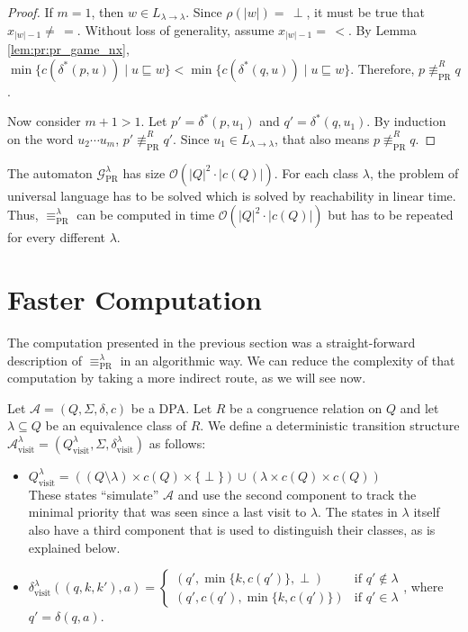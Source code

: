 \begin{proof}
	If $m = 1$, then $w \in L_{\lambda \rightarrow \lambda}$. Since $\rho(|w|) =\, \perp$, it must be true that $x_{|w|-1} \neq\, =$. Without loss of generality, assume $x_{|w|-1} =\, <$. By Lemma \ref{lem:pr:pr_game_nx}, $\min \{ c(\delta^*(p, u)) \mid u \sqsubseteq w \} < \min \{ c(\delta^*(q, u)) \mid u \sqsubseteq w \}$. Therefore, $p \not\equiv_\text{PR}^R q$.
	
	Now consider $m+1 > 1$. Let $p' = \delta^*(p, u_1)$ and $q' = \delta^*(q, u_1)$. By induction on the word $u_2 \cdots u_m$, $p' \not\equiv_\text{PR}^R q'$. Since $u_1 \in L_{\lambda \rightarrow \lambda}$, that also means $p \not\equiv_\text{PR}^R q$.
\end{proof}

\vspace{5pt}
The automaton $\mathcal{G}_\text{PR}^\lambda$ has size $\mathcal{O}(|Q|^2 \cdot |c(Q)|)$. For each class $\lambda$, the problem of universal language has to be solved which is solved by reachability in linear time. Thus, $\equiv_\text{PR}^\lambda$ can be computed in time $\mathcal{O}(|Q|^2 \cdot |c(Q)|)$ but has to be repeated for every different $\lambda$.



\section{Faster Computation}
The computation presented in the previous section was a straight-forward description of $\equiv_\text{PR}^\lambda$ in an algorithmic way. We can reduce the complexity of that computation by taking a more indirect route, as we will see now.

\begin{defn}
	Let $\mathcal{A} = (Q, \Sigma, \delta, c)$ be a DPA. Let $R$ be a congruence relation on $Q$ and let $\lambda \subseteq Q$ be an equivalence class of $R$. We define a deterministic transition structure $\mathcal{A}^\lambda_\text{visit} = (Q^\lambda_\text{visit}, \Sigma, \delta^\lambda_\text{visit})$ as follows:
	
	\begin{itemize}
		\item $Q^\lambda_\text{visit} = ((Q \setminus \lambda) \times c(Q) \times \{\perp\}) \cup (\lambda \times c(Q) \times c(Q))$ \\
		These states \enquote{simulate} $\mathcal{A}$ and use the second component to track the minimal priority that was seen since a last visit to $\lambda$. The states in $\lambda$ itself also have a third component that is used to distinguish their classes, as is explained below.
		\item $\delta^\lambda_\text{visit}((q, k, k'), a) = \begin{cases}
			(q', \min \{k, c(q')\}, \perp) & \text{if } q' \notin \lambda \\
			(q', c(q'), \min \{k, c(q')\}) & \text{if } q' \in \lambda
		\end{cases}$, where $q' = \delta(q, a)$.
	\end{itemize}
\end{defn}

